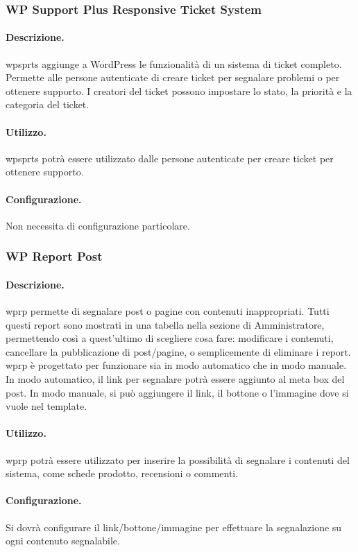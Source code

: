 \subsubsection{WP Support Plus Responsive Ticket System} \label{plugin:wpsprts}
\paragraph{Descrizione.} \gls{wpsprts} aggiunge a WordPress le funzionalità di un sistema di ticket completo. Permette alle persone autenticate di creare ticket per segnalare problemi o per ottenere supporto. I creatori del ticket possono impostare lo stato, la priorità e la categoria del ticket.
\paragraph{Utilizzo.} \gls{wpsprts} potrà essere utilizzato dalle persone autenticate per creare ticket per ottenere supporto.
\paragraph{Configurazione.} Non necessita di configurazione particolare.

\subsubsection{WP Report Post} \label{plugin:wprp}
\paragraph{Descrizione.} \gls{wprp} permette di segnalare post o pagine con contenuti inappropriati. Tutti questi report sono mostrati in una tabella nella sezione di Amministratore, permettendo così a quest'ultimo di scegliere cosa fare: modificare i contenuti, cancellare la pubblicazione di post/pagine, o semplicemente di eliminare i report. \gls{wprp} è progettato per funzionare sia in modo automatico che in modo manuale. In modo automatico, il link per segnalare potrà essere aggiunto al meta box del post. In modo manuale, si può aggiungere il link, il bottone o l'immagine dove si vuole nel template.
\paragraph{Utilizzo.} \gls{wprp} potrà essere utilizzato per inserire la possibilità di segnalare i contenuti del sistema, come schede prodotto, recensioni o commenti.
\paragraph{Configurazione.} Si dovrà configurare il link/bottone/immagine per effettuare la segnalazione su ogni contenuto segnalabile.

